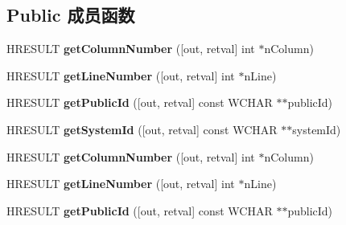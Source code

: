\subsection*{Public 成员函数}
\begin{DoxyCompactItemize}
\item 
\mbox{\label{interface_m_s_x_m_l2_1_1_i_s_a_x_locator_a076e16993ab3ee66d8c42d2f6cce46a0}} 
H\+R\+E\+S\+U\+LT {\bfseries get\+Column\+Number} (\mbox{[}out, retval\mbox{]} int $\ast$n\+Column)
\item 
\mbox{\label{interface_m_s_x_m_l2_1_1_i_s_a_x_locator_acd63852888dc1baa04587ba72ffe6109}} 
H\+R\+E\+S\+U\+LT {\bfseries get\+Line\+Number} (\mbox{[}out, retval\mbox{]} int $\ast$n\+Line)
\item 
\mbox{\label{interface_m_s_x_m_l2_1_1_i_s_a_x_locator_aed81dca09f2db453d40d7da329346413}} 
H\+R\+E\+S\+U\+LT {\bfseries get\+Public\+Id} (\mbox{[}out, retval\mbox{]} const W\+C\+H\+AR $\ast$$\ast$public\+Id)
\item 
\mbox{\label{interface_m_s_x_m_l2_1_1_i_s_a_x_locator_abed62079008dfd1f8c7050edadf0ce7a}} 
H\+R\+E\+S\+U\+LT {\bfseries get\+System\+Id} (\mbox{[}out, retval\mbox{]} const W\+C\+H\+AR $\ast$$\ast$system\+Id)
\item 
\mbox{\label{interface_m_s_x_m_l2_1_1_i_s_a_x_locator_a076e16993ab3ee66d8c42d2f6cce46a0}} 
H\+R\+E\+S\+U\+LT {\bfseries get\+Column\+Number} (\mbox{[}out, retval\mbox{]} int $\ast$n\+Column)
\item 
\mbox{\label{interface_m_s_x_m_l2_1_1_i_s_a_x_locator_acd63852888dc1baa04587ba72ffe6109}} 
H\+R\+E\+S\+U\+LT {\bfseries get\+Line\+Number} (\mbox{[}out, retval\mbox{]} int $\ast$n\+Line)
\item 
\mbox{\label{interface_m_s_x_m_l2_1_1_i_s_a_x_locator_aed81dca09f2db453d40d7da329346413}} 
H\+R\+E\+S\+U\+LT {\bfseries get\+Public\+Id} (\mbox{[}out, retval\mbox{]} const W\+C\+H\+AR $\ast$$\ast$public\+Id)
\item 
$$
\end{DoxyCompactItemize}
